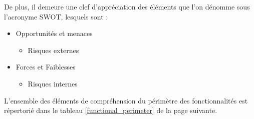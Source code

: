 \documentclass[12pt]{article}
\begin{document}
De plus, il demeure une clef d’appréciation des éléments que l’on dénomme sous l’acronyme SWOT, lesquels sont :
\begin{itemize}
	\item Opportunités et menaces
	\begin{itemize}
		\item Risques externes
	\end{itemize}
	\item Forces et Faiblesses
	\begin{itemize}
		\item Risques internes
	\end{itemize}
\end{itemize}

L’ensemble des éléments de compréhension du périmètre des fonctionnalités est répertorié dans le tableau \ref{functional_perimeter} de la page suivante.
\end{document}
